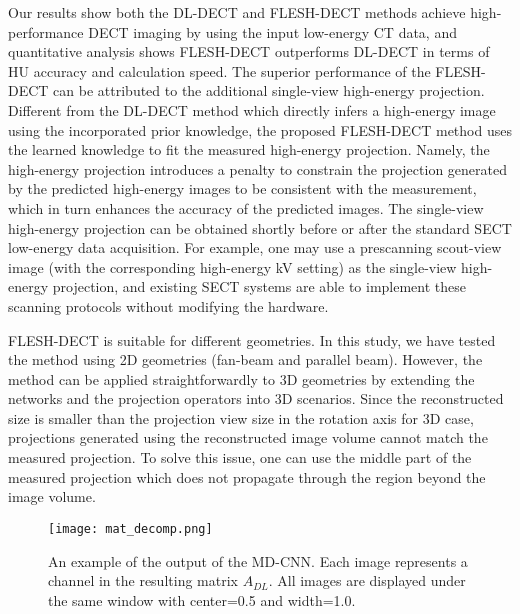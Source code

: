 \documentclass[journal,twoside,web]{ieeecolor}
\begin{document}
Our results show both the DL-DECT and FLESH-DECT methods achieve high-performance DECT imaging by using the input low-energy CT data, and quantitative analysis shows FLESH-DECT outperforms DL-DECT in terms of HU accuracy and calculation speed. The superior performance of the FLESH-DECT can be attributed to the additional single-view high-energy projection. Different from the DL-DECT method which directly infers a high-energy image using the incorporated prior knowledge, the proposed FLESH-DECT method uses the learned knowledge to fit the measured high-energy projection. Namely, the high-energy projection introduces a penalty to constrain the projection generated by the predicted high-energy images to be consistent with the measurement, which in turn enhances the accuracy of the predicted images. The single-view high-energy projection can be obtained shortly before or after the standard SECT low-energy data acquisition. For example, one may use a prescanning scout-view image (with the corresponding high-energy kV setting) as the single-view high-energy projection, and existing SECT systems are able to implement these scanning protocols without modifying the hardware.

FLESH-DECT is suitable for different geometries. In this study, we have tested the method using 2D geometries (fan-beam and parallel beam). However, the method can be applied straightforwardly to 3D geometries by extending the networks and the projection operators into 3D scenarios. Since the reconstructed size is smaller than the projection view size in the rotation axis for 3D case, projections generated using the reconstructed image volume cannot match the measured projection. To solve this issue, one can use the middle part of the measured projection which does not propagate through the region beyond the image volume.

\begin{figure*}[tb]
    \centering
        \texttt{[image: mat\_decomp.png]}
        \caption{An example of the output of the MD-CNN. Each image represents a channel in the resulting matrix \(A_{DL}\). All images are displayed under the same window with center=0.5 and width=1.0.}
    \label{fig:10}
\end{figure*}
\end{document}
